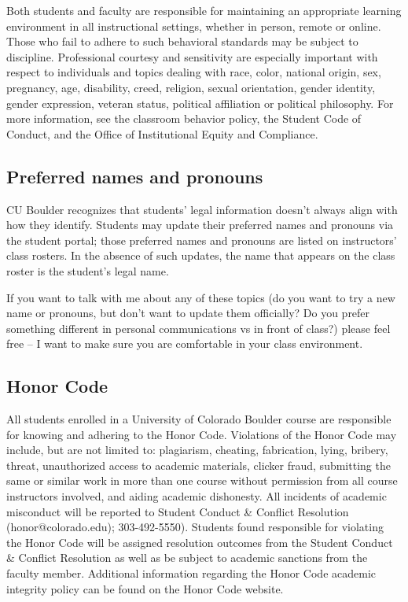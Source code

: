Both students and faculty are responsible for maintaining an appropriate learning environment in all instructional settings, whether in person, remote or online. Those who fail to adhere to such behavioral standards may be subject to discipline. Professional courtesy and sensitivity are especially important with respect to individuals and topics dealing with race, color, national origin, sex, pregnancy, age, disability, creed, religion, sexual orientation, gender identity, gender expression, veteran status, political affiliation or political philosophy.  For more information, see the classroom behavior policy, the Student Code of Conduct, and the Office of Institutional Equity and Compliance.

\subsection{Preferred names and pronouns}

CU Boulder recognizes that students' legal information doesn't always align with how they identify. Students may update their preferred names and pronouns via the student portal; those preferred names and pronouns are listed on instructors' class rosters. In the absence of such updates, the name that appears on the class roster is the student's legal name.

If you want to talk with me about any of these topics (do you want to try a new name or pronouns, but don't want to update them officially? Do you prefer something different in personal communications vs in front of class?) please feel free -- I want to make sure you are comfortable in your class environment.

\subsection{Honor Code}

All students enrolled in a University of Colorado Boulder course are responsible for knowing and adhering to the Honor Code. Violations of the Honor Code may include, but are not limited to: plagiarism, cheating, fabrication, lying, bribery, threat, unauthorized access to academic materials, clicker fraud, submitting the same or similar work in more than one course without permission from all course instructors involved, and aiding academic dishonesty. All incidents of academic misconduct will be reported to Student Conduct \& Conflict Resolution (honor@colorado.edu); 303-492-5550). Students found responsible for violating the Honor Code will be assigned resolution outcomes from the Student Conduct \& Conflict Resolution as well as be subject to academic sanctions from the faculty member. Additional information regarding the Honor Code academic integrity policy can be found on the Honor Code website.

